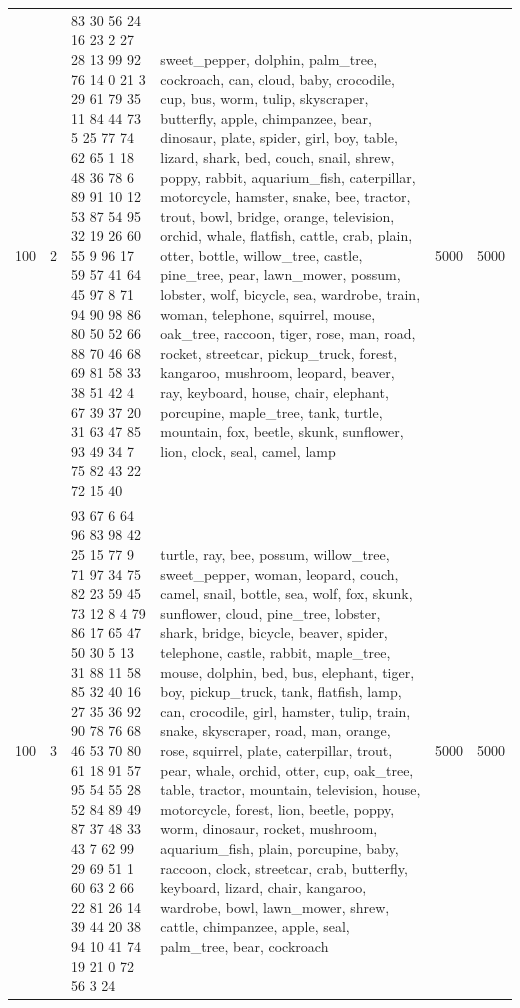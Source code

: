 \begin{tabular}{rrllrr}
100 & 2 & 83 30 56 24 16 23 2 27 28 13 99 92 76 14 0 21 3 29 61 79 35 11 84 44 73 5 25 77 74 62 65 1 18 48 36 78 6 89 91 10 12 53 87 54 95 32 19 26 60 55 9 96 17 59 57 41 64 45 97 8 71 94 90 98 86 80 50 52 66 88 70 46 68 69 81 58 33 38 51 42 4 67 39 37 20 31 63 47 85 93 49 34 7 75 82 43 22 72 15 40 & sweet_pepper, dolphin, palm_tree, cockroach, can, cloud, baby, crocodile, cup, bus, worm, tulip, skyscraper, butterfly, apple, chimpanzee, bear, dinosaur, plate, spider, girl, boy, table, lizard, shark, bed, couch, snail, shrew, poppy, rabbit, aquarium_fish, caterpillar, motorcycle, hamster, snake, bee, tractor, trout, bowl, bridge, orange, television, orchid, whale, flatfish, cattle, crab, plain, otter, bottle, willow_tree, castle, pine_tree, pear, lawn_mower, possum, lobster, wolf, bicycle, sea, wardrobe, train, woman, telephone, squirrel, mouse, oak_tree, raccoon, tiger, rose, man, road, rocket, streetcar, pickup_truck, forest, kangaroo, mushroom, leopard, beaver, ray, keyboard, house, chair, elephant, porcupine, maple_tree, tank, turtle, mountain, fox, beetle, skunk, sunflower, lion, clock, seal, camel, lamp & 5000 & 5000 \\
100 & 3 & 93 67 6 64 96 83 98 42 25 15 77 9 71 97 34 75 82 23 59 45 73 12 8 4 79 86 17 65 47 50 30 5 13 31 88 11 58 85 32 40 16 27 35 36 92 90 78 76 68 46 53 70 80 61 18 91 57 95 54 55 28 52 84 89 49 87 37 48 33 43 7 62 99 29 69 51 1 60 63 2 66 22 81 26 14 39 44 20 38 94 10 41 74 19 21 0 72 56 3 24 & turtle, ray, bee, possum, willow_tree, sweet_pepper, woman, leopard, couch, camel, snail, bottle, sea, wolf, fox, skunk, sunflower, cloud, pine_tree, lobster, shark, bridge, bicycle, beaver, spider, telephone, castle, rabbit, maple_tree, mouse, dolphin, bed, bus, elephant, tiger, boy, pickup_truck, tank, flatfish, lamp, can, crocodile, girl, hamster, tulip, train, snake, skyscraper, road, man, orange, rose, squirrel, plate, caterpillar, trout, pear, whale, orchid, otter, cup, oak_tree, table, tractor, mountain, television, house, motorcycle, forest, lion, beetle, poppy, worm, dinosaur, rocket, mushroom, aquarium_fish, plain, porcupine, baby, raccoon, clock, streetcar, crab, butterfly, keyboard, lizard, chair, kangaroo, wardrobe, bowl, lawn_mower, shrew, cattle, chimpanzee, apple, seal, palm_tree, bear, cockroach & 5000 & 5000 \\

\end{tabular}
